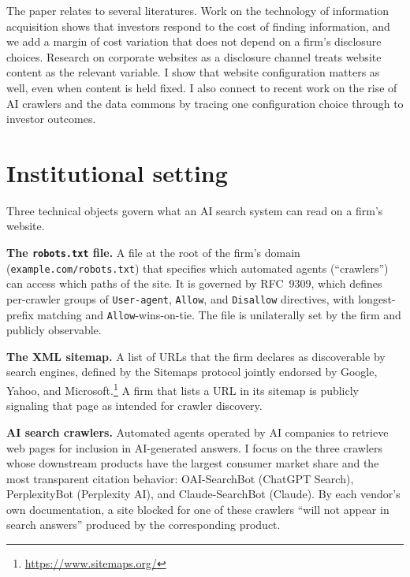\documentclass[11pt]{article}
\begin{document}
The paper relates to several literatures. Work on the technology of information
acquisition \citep{da2011search, drake2012investor, gao2020informativeness}
shows that investors respond to the cost of finding information, and we add a
margin of cost variation that does not depend on a firm's disclosure choices.
Research on corporate websites as a disclosure channel
\citep{boulland2025website} treats website content as the relevant variable.
I show that website configuration matters as well, even when content is held
fixed. I also connect to recent work on the rise of AI crawlers and the data
commons \citep{longpre2024consent, cui2025robots} by tracing one
configuration choice through to investor outcomes.

\section{Institutional setting}

Three technical objects govern what an AI search system can read on a firm's
website.

\textbf{The \texttt{robots.txt} file.} A file at the root of the firm's
domain (\texttt{example.com/robots.txt}) that specifies which automated
agents (``crawlers'') can access which paths of the site. It is governed by
RFC~9309, which defines per-crawler groups of \texttt{User-agent},
\texttt{Allow}, and \texttt{Disallow} directives, with longest-prefix
matching and \texttt{Allow}-wins-on-tie. The file is unilaterally set by the
firm and publicly observable.

\textbf{The XML sitemap.} A list of URLs that the firm declares as
discoverable by search engines, defined by the Sitemaps protocol jointly
endorsed by Google, Yahoo, and Microsoft.\footnote{\url{https://www.sitemaps.org/}}
A firm that lists a URL in its sitemap is publicly signaling that page as
intended for crawler discovery.

\textbf{AI search crawlers.} Automated agents operated by AI companies to
retrieve web pages for inclusion in AI-generated answers. I focus on the
three crawlers whose downstream products have the largest consumer market
share and the most transparent citation behavior: OAI-SearchBot (ChatGPT
Search), PerplexityBot (Perplexity AI), and Claude-SearchBot (Claude). By
each vendor's own documentation, a site blocked for one of these crawlers
``will not appear in search answers'' produced by the corresponding product.
\end{document}
